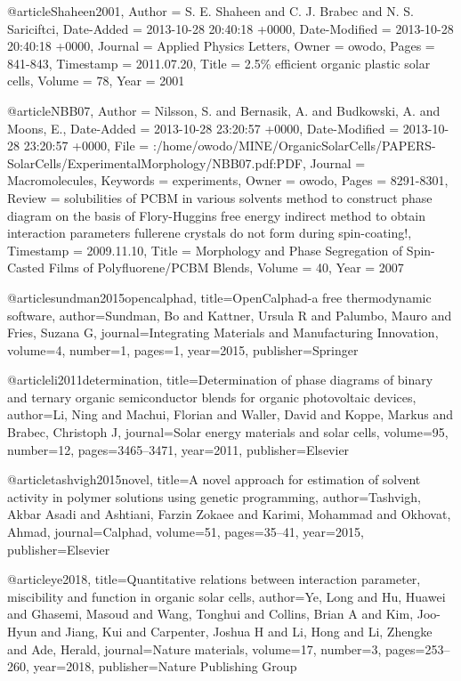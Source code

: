 
@article{Shaheen2001,
	Author = {S. E. Shaheen and C. J. Brabec and N. S. Sariciftci},
	Date-Added = {2013-10-28 20:40:18 +0000},
	Date-Modified = {2013-10-28 20:40:18 +0000},
	Journal = {Applied Physics Letters},
	Owner = {owodo},
	Pages = {841-843},
	Timestamp = {2011.07.20},
	Title = {{2.5\% efficient organic plastic solar cells}},
	Volume = {78},
	Year = {2001}}


@article{NBB07,
	Author = {Nilsson, S. and Bernasik, A. and Budkowski, A. and Moons, E.},
	Date-Added = {2013-10-28 23:20:57 +0000},
	Date-Modified = {2013-10-28 23:20:57 +0000},
	File = {:/home/owodo/MINE/OrganicSolarCells/PAPERS-SolarCells/ExperimentalMorphology/NBB07.pdf:PDF},
	Journal = {Macromolecules},
	Keywords = {experiments},
	Owner = {owodo},
	Pages = {8291-8301},
	Review = {solubilities of PCBM in various solvents method to construct phase diagram on the basis of Flory-Huggins free energy indirect method to obtain interaction parameters fullerene crystals do not form during spin-coating!},
	Timestamp = {2009.11.10},
	Title = {Morphology and Phase Segregation of Spin-Casted Films of {P}olyfluorene/{PCBM} Blends},
	Volume = {40},
	Year = {2007}}



@article{sundman2015opencalphad,
  title={OpenCalphad-a free thermodynamic software},
  author={Sundman, Bo and Kattner, Ursula R and Palumbo, Mauro and Fries, Suzana G},
  journal={Integrating Materials and Manufacturing Innovation},
  volume={4},
  number={1},
  pages={1},
  year={2015},
  publisher={Springer}
}


@article{li2011determination,
  title={Determination of phase diagrams of binary and ternary organic semiconductor blends for organic photovoltaic devices},
  author={Li, Ning and Machui, Florian and Waller, David and Koppe, Markus and Brabec, Christoph J},
  journal={Solar energy materials and solar cells},
  volume={95},
  number={12},
  pages={3465--3471},
  year={2011},
  publisher={Elsevier}
}


@article{tashvigh2015novel,
  title={A novel approach for estimation of solvent activity in polymer solutions using genetic programming},
  author={Tashvigh, Akbar Asadi and Ashtiani, Farzin Zokaee and Karimi, Mohammad and Okhovat, Ahmad},
  journal={Calphad},
  volume={51},
  pages={35--41},
  year={2015},
  publisher={Elsevier}
}


@article{ye2018,
  title={Quantitative relations between interaction parameter, miscibility and function in organic solar cells},
  author={Ye, Long and Hu, Huawei and Ghasemi, Masoud and Wang, Tonghui and Collins, Brian A and Kim, Joo-Hyun and Jiang, Kui and Carpenter, Joshua H and Li, Hong and Li, Zhengke and Ade, Herald},
  journal={Nature materials},
  volume={17},
  number={3},
  pages={253--260},
  year={2018},
  publisher={Nature Publishing Group}
}


